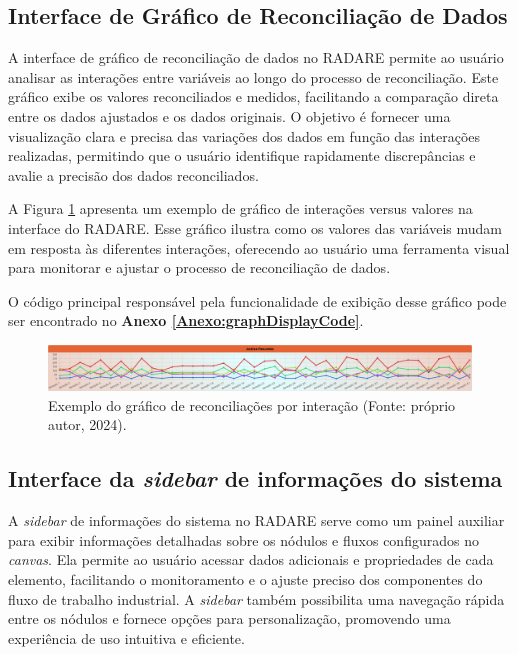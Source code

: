 \subsection{Interface de Gráfico de Reconciliação de Dados}

A interface de gráfico de reconciliação de dados no RADARE permite ao usuário analisar as interações entre variáveis ao longo do processo de reconciliação. Este gráfico exibe os valores reconciliados e medidos, facilitando a comparação direta entre os dados ajustados e os dados originais. O objetivo é fornecer uma visualização clara e precisa das variações dos dados em função das interações realizadas, permitindo que o usuário identifique rapidamente discrepâncias e avalie a precisão dos dados reconciliados.

A Figura \ref{Fig:ReconciliationGraph} apresenta um exemplo de gráfico de interações versus valores na interface do RADARE. Esse gráfico ilustra como os valores das variáveis mudam em resposta às diferentes interações, oferecendo ao usuário uma ferramenta visual para monitorar e ajustar o processo de reconciliação de dados.

O código principal responsável pela funcionalidade de exibição desse gráfico pode ser encontrado no \textbf{Anexo \ref{Anexo:graphDisplayCode}}.

\begin{figure}[htbp]
    \centering
    \includegraphics[width=1\textwidth]{figuras/interface-grafico.png}
    \caption{Exemplo do gráfico de reconciliações por interação (Fonte: próprio autor, 2024).}
    \label{Fig:ReconciliationGraph}
\end{figure}

\subsection{Interface da \textit{sidebar} de informações do sistema}

A \textit{sidebar} de informações do sistema no RADARE serve como um painel auxiliar para exibir informações detalhadas sobre os nódulos e fluxos configurados no \textit{canvas}. Ela permite ao usuário acessar dados adicionais e propriedades de cada elemento, facilitando o monitoramento e o ajuste preciso dos componentes do fluxo de trabalho industrial. A \textit{sidebar} também possibilita uma navegação rápida entre os nódulos e fornece opções para personalização, promovendo uma experiência de uso intuitiva e eficiente.

